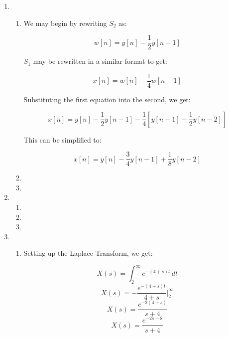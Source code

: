 \begin{enumerate}

  \item

    \begin{enumerate}

      \item 

        We may begin by rewriting $S_2$ as:

        $$w[n]=y[n]-\frac{1}{2}y[n-1]$$

        $S_1$ may be rewritten in a similar format to get:

        $$x[n]=w[n]-\frac{1}{4}w[n-1]$$

        Substituting the first equation into the second, we get:

        $$x[n]=y[n]-\frac{1}{2}y[n-1]-\frac{1}{4}\left[ y[n-1]-\frac{1}{2}y[n-2] \right]$$

        This can be simplified to:

        $$\boxed{x[n]=y[n]-\frac{3}{4}y[n-1]+\frac{1}{8}y[n-2]}$$

      \item 

      \item 

    \end{enumerate}

  \item

    \begin{enumerate}

      \item 

      \item 

      \item 

    \end{enumerate}

  \item

    \begin{enumerate}

      \item 

        Setting up the Laplace Transform, we get:

        $$X(s)=\int_{2}^{\infty}e^{-(4+s)t}\,dt$$
        $$X(s)=-\frac{e^{-(4+s)t}}{4+s}\Big|_2^{\infty}$$
        $$X(s)=\frac{e^{-2(4+s)}}{s+4}$$
        $$\boxed{X(s)=\frac{e^{-2s-8}}{s+4}}$$


\end{enumerate}
\end{enumerate}
